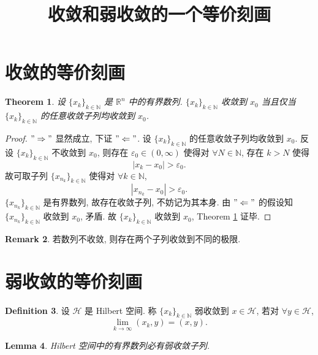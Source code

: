\documentclass[a4paper,11pt]{article}
\title{收敛和弱收敛的一个等价刻画}
\newtheorem{theorem}{Theorem}[section]
\newtheorem{lemma}[theorem]{Lemma}
\theoremstyle{definition}
\newtheorem{remark}[theorem]{Remark}
\newtheorem{definition}[theorem]{Definition}
\begin{document}
\begin{CJK*}{UTF8}{gbsn}

\maketitle

\section{收敛的等价刻画}

\begin{theorem} \label{thm1}
    设 $ \{x_k\}_{k \in \mathbb{N}} $ 是 $ \mathbb{R}^n $ 中的有界数列.
    $ \{x_k\}_{k \in \mathbb{N}} $ 收敛到 $ x_0 $ 当且仅当 
    $ \{x_k\}_{k \in \mathbb{N}} $ 的任意收敛子列均收敛到 $ x_0 $.
\end{theorem}

\begin{proof}
    $ "\Rightarrow" $ 显然成立, 下证 $ "\Leftarrow" $. 
    设 $ \{x_k\}_{k \in \mathbb{N}} $ 的任意收敛子列均收敛到 $ x_0 $.
    反设 $ \{x_k\}_{k \in \mathbb{N}} $ 不收敛到 $ x_0 $, 
    则存在 $ \varepsilon_0 \in (0, \infty) $ 使得对 $ \forall N \in \mathbb{N} $, 存在 $ k > N $ 使得
    $$
        |x_k - x_0| > \varepsilon_0.
    $$
    故可取子列 $ \{x_{n_k}\}_{k \in \mathbb{N}} $ 使得对 $ \forall k \in \mathbb{N} $,
    $$
        |x_{n_k} - x_0| > \varepsilon_0.
    $$
    $ \{x_{n_k}\}_{k \in \mathbb{N}} $ 是有界数列, 故存在收敛子列, 不妨记为其本身.
    由 $ "\Leftarrow" $ 的假设知 $ \{x_{n_k}\}_{k \in \mathbb{N}} $ 收敛到 $ x_0 $, 矛盾.
    故 $ \{x_k\}_{k \in \mathbb{N}} $ 收敛到 $ x_0 $, Theorem \ref{thm1} 证毕.
\end{proof}

\begin{remark}
    若数列不收敛, 则存在两个子列收敛到不同的极限.
\end{remark}

\section{弱收敛的等价刻画}

\begin{definition}
    设 $ \mathcal{H} $ 是 Hilbert 空间. 称 $ \{x_k\}_{k \in \mathbb{N}} $ 弱收敛到 $ x \in \mathcal{H} $,
    若对 $ \forall y \in \mathcal{H} $,
    $$
        \lim_{k \to \infty} (x_k, y) = (x, y).
    $$
\end{definition}

\begin{lemma} \label{lem}
    Hilbert 空间中的有界数列必有弱收敛子列.
\end{lemma}


\end{CJK*}
\end{document}
